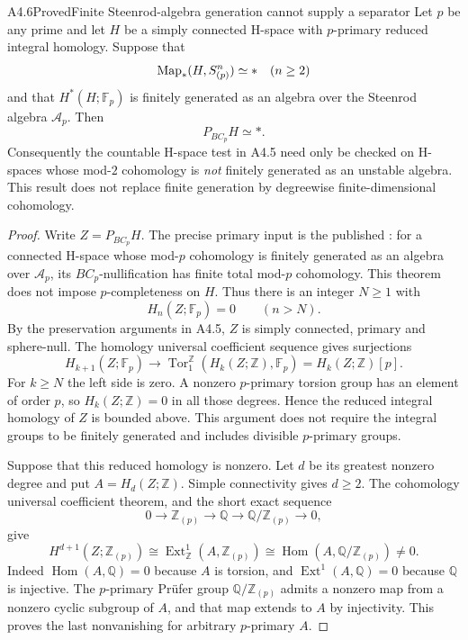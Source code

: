 \begin{claim}{A4.6}{Proved}{Finite Steenrod-algebra generation cannot supply a separator}
\label{A46}
Let $p$ be any prime and let $H$ be a simply connected H-space
with $p$-primary reduced integral homology.  Suppose that
\[
 \operatorname{Map}_*(H,S^n_{(p)})\simeq *\quad(n\geq2)
\]
and that $H^*(H;\mathbb F_p)$ is finitely generated as an algebra
over the Steenrod algebra $\mathcal A_p$.  Then
\[
                         P_{BC_p}H\simeq *.
 \tag{A4.6.1}
\]
Consequently the countable H-space test in A4.5 need only be
checked on H-spaces whose mod-$2$ cohomology is \emph{not}
finitely generated as an unstable algebra.  This result does not
replace finite generation by degreewise finite-dimensional
cohomology.
\end{claim}
\begin{proof}
Write $Z=P_{BC_p}H$.  The precise primary input is the published
\citet[Theorem~7.2]{A4CCSDeconstruct2007}: for a connected H-space
whose mod-$p$ cohomology is finitely generated as an algebra over
$\mathcal A_p$, its $BC_p$-nullification has finite total mod-$p$
cohomology.  This theorem does not impose $p$-completeness on $H$.
Thus there is an integer $N\geq1$ with
\[
                         H_n(Z;\mathbb F_p)=0\qquad(n>N).
 \tag{A4.6.2}
\]
By the preservation arguments in A4.5, $Z$ is simply connected,
primary and sphere-null.  The homology universal coefficient
sequence gives surjections
\[
 H_{k+1}(Z;\mathbb F_p)\longrightarrow
 \operatorname{Tor}^{\mathbb Z}_1
       (H_k(Z;\mathbb Z),\mathbb F_p)
       =H_k(Z;\mathbb Z)[p].
 \tag{A4.6.3}
\]
For $k\geq N$ the left side is zero.  A nonzero $p$-primary
torsion group has an element of order $p$, so
$H_k(Z;\mathbb Z)=0$ in all those degrees.  Hence the reduced
integral homology of $Z$ is bounded above.  This argument does
not require the integral groups to be finitely generated and
includes divisible $p$-primary groups.

Suppose that this reduced homology is nonzero.  Let $d$ be its
greatest nonzero degree and put $A=H_d(Z;\mathbb Z)$.
Simple connectivity gives $d\geq2$.  The cohomology universal
coefficient theorem, and the short exact sequence
\[
 0\longrightarrow\mathbb Z_{(p)}\longrightarrow\mathbb Q
 \longrightarrow\mathbb Q/\mathbb Z_{(p)}\longrightarrow0,
\]
give
\[
 H^{d+1}(Z;\mathbb Z_{(p)})
 \cong\operatorname{Ext}^1_{\mathbb Z}(A,\mathbb Z_{(p)})
 \cong\operatorname{Hom}(A,\mathbb Q/\mathbb Z_{(p)})\ne0.
 \tag{A4.6.4}
\]
Indeed $\operatorname{Hom}(A,\mathbb Q)=0$ because $A$ is
torsion, and $\operatorname{Ext}^1(A,\mathbb Q)=0$ because
$\mathbb Q$ is injective.  The $p$-primary Pr\"ufer group
$\mathbb Q/\mathbb Z_{(p)}$ admits a nonzero map from a
nonzero cyclic subgroup of $A$, and that map extends to $A$
by injectivity.  This proves the last nonvanishing for arbitrary
$p$-primary $A$.


\end{proof}

